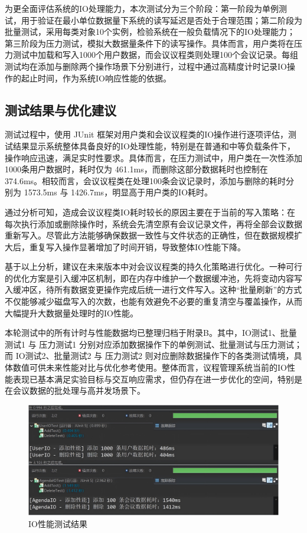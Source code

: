\documentclass[a4paper, twoside, utf8]{ctexart}
\begin{document}
    为更全面评估系统的IO处理能力，本次测试分为三个阶段：第一阶段为单例测试，用于验证在最小单位数据量下系统的读写延迟是否处于合理范围；第二阶段为批量测试，采用每类对象10个实例，检验系统在一般负载情况下的IO处理能力；第三阶段为压力测试，模拟大数据量条件下的读写操作。具体而言，用户类将在压力测试中加载和写入1000个用户数据，而会议议程类则处理100个会议记录。每组测试均在添加与删除两个操作场景下分别进行，过程中通过高精度计时记录IO操作的起止时间，作为系统IO响应性能的依据。

    \subsection{测试结果与优化建议}

    测试过程中，使用 JUnit 框架对用户类和会议议程类的IO操作进行逐项评估，测试结果显示系统整体具备良好的IO处理性能，特别是在普通和中等负载条件下，操作响应迅速，满足实时性要求。具体而言，在压力测试中，用户类在一次性添加1000条用户数据时，耗时仅为 461.1ms，而删除这部分数据耗时也控制在 374.6ms。相较而言，会议议程类在处理100条会议记录时，添加与删除的耗时分别为 1573.5ms 与 1426.7ms，明显高于用户类的IO耗时。

    通过分析可知，造成会议议程类IO耗时较长的原因主要在于当前的写入策略：在每次执行添加或删除操作时，系统会先清空原有会议记录文件，再将全部会议数据重新写入。尽管此方法能够确保数据一致性与文件状态的正确性，但在数据规模扩大后，重复写入操作显著增加了时间开销，导致整体IO性能下降。

    基于以上分析，建议在未来版本中对会议议程类的持久化策略进行优化。一种可行的优化方案是引入缓冲区机制，即在内存中维护一个数据缓冲池，先将变动内容写入缓冲区，待所有数据变更操作完成后统一进行文件写入。这种“批量刷新”的方式不仅能够减少磁盘写入的次数，也能有效避免不必要的重复清空与覆盖操作，从而大幅提升大数据量处理时的IO性能。

    本轮测试中的所有计时与性能数据均已整理归档于附录B。其中，IO测试1、批量测试1 与 压力测试1 分别对应添加数据操作下的单例测试、批量测试与压力测试；而 IO测试2、批量测试2 与 压力测试2 则对应删除数据操作下的各类测试情境，具体数值可供未来性能对比与优化参考使用。整体而言，议程管理系统当前的IO性能表现已基本满足实验目标与交互响应需求，但仍存在进一步优化的空间，特别是在会议数据的批处理与高并发场景下。

    \begin{figure}[htbp]
        \centering
        \includegraphics[width=.9\linewidth]{figure/IOTest.png}
        \caption{IO性能测试结果}
    \end{figure}
\end{document}
